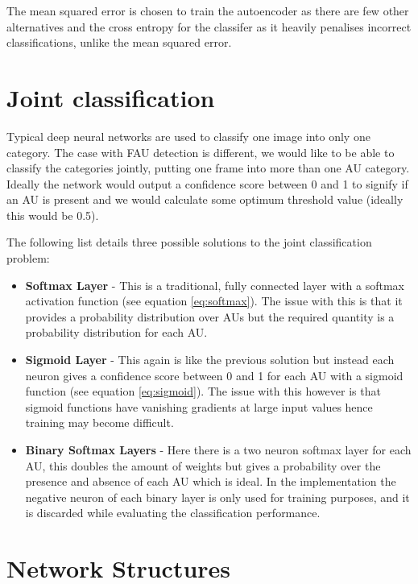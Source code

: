     The mean squared error is chosen to train the autoencoder as there are few other alternatives
    and the cross entropy for the classifer as it heavily penalises incorrect classifications,
    unlike the mean squared error.

  \section{Joint classification}

    Typical deep neural networks are used to classify
    one image into only one category. The case with FAU detection is different, we
    would like to be able to classify the categories jointly,  putting one frame into more than
    one AU category. Ideally the network would output a confidence score between 0 and 1
    to signify if an AU is present and we would calculate some optimum threshold value
    (ideally this would be 0.5).

    The following list details three possible solutions to the joint classification problem:

    \begin{itemize} \label{sec:binsoft}
      \item {\bf Softmax Layer} - This is a traditional, fully connected layer with
      a softmax activation function (see equation \ref{eq:softmax}).
      The issue with this is that it provides a probability distribution over AUs
      but the required quantity is a probability distribution for each AU.
      \item {\bf Sigmoid Layer} - This again is like the previous solution but instead each neuron gives a confidence
      score between 0 and 1 for each AU with a sigmoid function (see equation \ref{eq:sigmoid}).
      The issue with this however is that sigmoid
      functions have vanishing gradients at large input values
      hence training may become difficult.
      \item {\bf Binary Softmax Layers} - Here there is a two neuron softmax layer
      for each AU, this doubles the amount of weights
      but gives a probability over the presence and
      absence of each AU which is ideal. In the implementation
      the negative neuron of each binary layer is only used for training purposes, and it is
      discarded while evaluating the classification performance.
    \end{itemize}


  \section{Network Structures}

